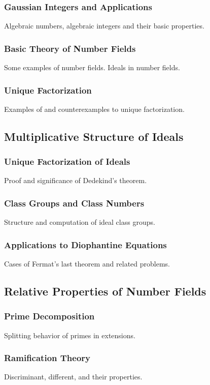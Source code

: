 \documentclass[12pt]{article}
\begin{document}
\subsubsection{Gaussian Integers and Applications}
Algebraic numbers, algebraic integers and their basic properties.

\subsubsection{Basic Theory of Number Fields}
Some examples of number fields. Ideals in number fields.

\subsubsection{Unique Factorization}
Examples of and counterexamples to unique factorization.

\subsection{Multiplicative Structure of Ideals}
\subsubsection{Unique Factorization of Ideals}
Proof and significance of Dedekind's theorem.

\subsubsection{Class Groups and Class Numbers}
Structure and computation of ideal class groups.

\subsubsection{Applications to Diophantine Equations}
Cases of Fermat's last theorem and related problems.

\subsection{Relative Properties of Number Fields}
\subsubsection{Prime Decomposition}
Splitting behavior of primes in extensions.

\subsubsection{Ramification Theory}
Discriminant, different, and their properties.
\end{document}

